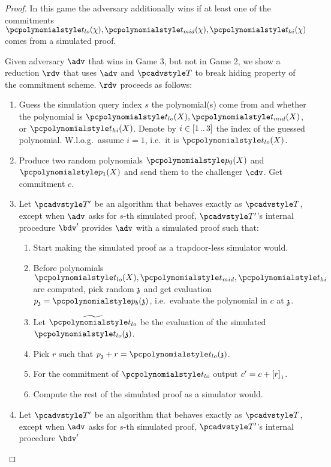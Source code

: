 \documentclass[runningheads,11pt]{llncs}
\begin{document}
\begin{proof}
   In this game the adversary additionally wins if at least one of
  the commitments $\p{t_{lo}} (\chi), \p{t_{mid}} (\chi), \p{t_{hi}} (\chi)$
  comes from a simulated proof.

   Given adversary $\adv$ that wins in Game
  3, but not in Game 2, we show a reduction $\rdv$ that uses $\adv$ and $\tdv$
  to break hiding property  of the commitment scheme. $\rdv$ proceeds as follows:
  \begin{enumerate}
  \item Guess the simulation query index $s$ the polynomial(s) come from and
    whether the polynomial is $\p{t_{lo}} (X), \p{t_{mid}} (X)$, or
    $\p{t_{hi}} (X)$. Denote by $i \in [1 \, .. \, 3]$ the index of the guessed
    polynomial. W.l.o.g.~assume $i = 1$, i.e.~it is $\p{t_{lo}} (X)$.
  \item Produce two random polynomials $\p{p_0} (X)$ and $\p{p_1} (X)$ and
    send them to the challenger $\cdv$. Get commitment $c$.
  \item Let $\tdv'$ be an algorithm that behaves exactly as $\tdv$, except when
    $\adv$ asks for $s$-th simulated proof, $\tdv'$'s internal procedure $\bdv'$
    provides $\adv$ with a simulated proof such that:
    \begin{enumerate}
    \item Start making the simulated proof as a trapdoor-less simulator would.
    \item Before polynomials $\p{t_{lo}} (X), \p{t_{mid}}, \p{t_{hi}}$ are
      computed, pick random $\mathfrak{z}$ and get evaluation $p_\chz = \p{p_b} (\chz)$,
      i.e.~evaluate the polynomial in $c$ at $\mathfrak{z}$. 
    \item Let $\ev{t_{lo}}$ be the evaluation of the simulated $\p{t_{lo}} (\chz)$.
    \item Pick $r$ such that $p_\chz + r = \p{t_{lo}} (\chz)$.
    \item For the commitment of $\p{t_{lo}}$ output $c' = c + \left[r\right]_{1}$.
    \item Compute the rest of the simulated proof as a simulator would.
    \end{enumerate}
  \item Let $\tdv'$ be an algorithm that behaves exactly as $\tdv$, except when
    $\adv$ asks for $s$-th simulated proof, $\tdv'$'s internal procedure $\bdv'$

\end{enumerate}
\end{proof}
\end{document}
